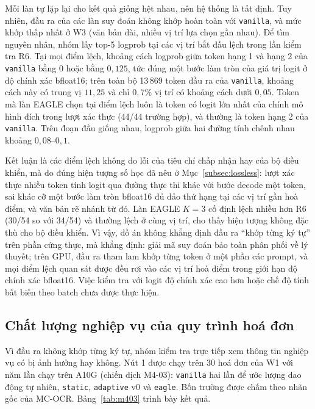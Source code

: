 Mỗi làn tự lặp lại cho kết quả giống hệt nhau, nên hệ thống là tất định. Tuy nhiên, đầu ra của các làn suy đoán không khớp hoàn toàn với \texttt{vanilla}, và mức khớp thấp nhất ở W3 (văn bản dài, nhiều vị trí lựa chọn gần nhau). Để tìm nguyên nhân, nhóm lấy top-5 logprob tại các vị trí bắt đầu lệch trong lần kiểm tra R6. Tại mọi điểm lệch, khoảng cách logprob giữa token hạng 1 và hạng 2 của \texttt{vanilla} bằng 0 hoặc bằng $0{,}125$, tức đúng một bước làm tròn của giá trị logit ở độ chính xác bfloat16; trên toàn bộ 13\,869 token đầu ra của \texttt{vanilla}, khoảng cách này có trung vị $11{,}25$ và chỉ $0{,}7\%$ vị trí có khoảng cách dưới $0{,}05$. Token mà làn EAGLE chọn tại điểm lệch luôn là token có logit lớn nhất của chính mô hình đích trong lượt xác thực (44/44 trường hợp), và thường là token hạng 2 của \texttt{vanilla}. Trên đoạn đầu giống nhau, logprob giữa hai đường tính chênh nhau khoảng $0{,}08$--$0{,}1$.

Kết luận là các điểm lệch không do lỗi của tiêu chí chấp nhận hay của bộ điều khiển, mà do đúng hiện tượng số học đã nêu ở Mục~\ref{subsec:lossless}: lượt xác thực nhiều token tính logit qua đường thực thi khác với bước decode một token, sai khác cỡ một bước làm tròn bfloat16 đủ đảo thứ hạng tại các vị trí gần hoà điểm, và văn bản rẽ nhánh từ đó. Làn EAGLE $K=3$ cố định lệch nhiều hơn R6 (30/54 so với 34/54) và thường lệch ở cùng vị trí, cho thấy hiện tượng không đặc thù cho bộ điều khiển. Vì vậy, đồ án không khẳng định đầu ra ``khớp từng ký tự'' trên phần cứng thực, mà khẳng định: giải mã suy đoán bảo toàn phân phối về lý thuyết; trên GPU, đầu ra tham lam khớp từng token ở một phần các prompt, và mọi điểm lệch quan sát được đều rơi vào các vị trí hoà điểm trong giới hạn độ chính xác bfloat16. Việc kiểm tra với logit độ chính xác cao hơn hoặc chế độ tính bất biến theo batch chưa được thực hiện.

\subsection{Chất lượng nghiệp vụ của quy trình hoá đơn}
\label{subsec:kq-chat-luong}

Vì đầu ra không khớp từng ký tự, nhóm kiểm tra trực tiếp xem thông tin nghiệp vụ có bị ảnh hưởng hay không. Nút 1 được chạy trên 30 hoá đơn của W1 với năm lần chạy trên A10G (chiến dịch M4-03): \texttt{vanilla} hai lần để ước lượng dao động tự nhiên, \texttt{static}, \texttt{adaptive} v0 và \texttt{eagle}. Bốn trường được chấm theo nhãn gốc của MC-OCR. Bảng~\ref{tab:m403} trình bày kết quả.


